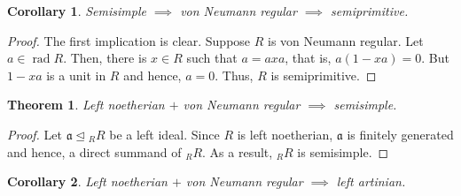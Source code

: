 \documentclass[12pt]{article}
\theoremstyle{thmstyle}
\newtheorem{theorem}{Theorem}[section]
\theoremstyle{defstyle}
\newtheorem*{corollary}{Corollary}
\newcommand{\fraka}{\mathfrak{a}} %
\newcommand{\rad}{\operatorname{rad}}
\begin{document}
\begin{corollary}
    Semisimple $\implies$ von Neumann regular $\implies$ semiprimitive.
\end{corollary}
\begin{proof}
    The first implication is clear. Suppose $R$ is von Neumann regular. Let $a\in\rad R$. Then, there is $x\in R$ such that $a = axa$, that is, $a(1 - xa) = 0$. But $1 - xa$ is a unit in $R$ and hence, $a = 0$. Thus, $R$ is semiprimitive.
\end{proof}

\begin{theorem}
    Left noetherian $+$ von Neumann regular $\implies$ semisimple.
\end{theorem}
\begin{proof}
    Let $\fraka\unlhd {}_RR$ be a left ideal. Since $R$ is left noetherian, $\fraka$ is finitely generated and hence, a direct summand of ${}_RR$. As a result, ${}_RR$ is semisimple.
\end{proof}

\begin{corollary}
    Left noetherian $+$ von Neumann regular $\implies$ left artinian.
\end{corollary}
\end{document}

